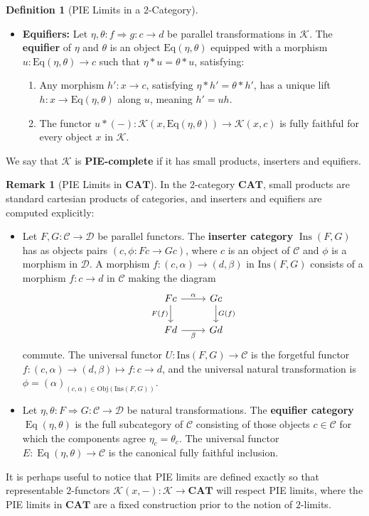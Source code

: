 \documentclass[11pt]{article}
\theoremstyle{plain}
\theoremstyle{definition}
\newtheorem{definition}[theorem]{Definition}
\newtheorem{remark}[theorem]{Remark}
\numberwithin{equation}{section}
\newcommand{\C}{\mathcal{C}}
\newcommand{\K}{\mathcal{K}}
\newcommand{\CAT}{\mathbf{CAT}}
\newcommand{\Ins}{\mathrm{Ins}}
\newcommand{\Eq}{\mathrm{Eq}}
\begin{document}
\begin{definition}[PIE Limits in a $2$-Category]
\begin{itemize}
       \item \textbf{Equifiers:} Let $\eta, \theta \colon f\Rightarrow g\colon c\to d$ be parallel transformations in $\K$. The \textbf{equifier} of $\eta$ and $\theta$ is an object $\Eq(\eta, \theta)$ equipped with a morphism $u \colon \Eq(\eta, \theta) \to c$ such that $\eta * u = \theta * u$, satisfying:
       \begin{enumerate}[label=(\roman*)]
           \item Any morphism $h'\colon x\to c$, satisfying $\eta*h' = \theta*h'$, has a unique lift $h\colon x\to \Eq(\eta,\theta)$ along $u$, meaning $h' = uh$.
           \item The functor $u*(-)\colon \K(x,\Eq(\eta,\theta))\to \K(x,c)$ is fully faithful for every object $x$ in $\K$.
       \end{enumerate}
   \end{itemize}
   We say that $\K$ is \textbf{PIE-complete} if it has small products, inserters and equifiers.
\end{definition}

\begin{remark}[PIE Limits in $\CAT$]
   In the $2$-category $\CAT$, small products are standard cartesian products of categories, and inserters and equifiers are computed explicitly:
   \begin{itemize}
       \item Let $F, G \colon \C \to \mathcal{D}$ be parallel functors. The \textbf{inserter category} $\operatorname{Ins}(F, G)$ has as objects pairs $(c, \phi\colon Fc\to Gc)$, where $c$ is an object of $\C$ and $\phi$ is a morphism in $\mathcal{D}$. A morphism $f\colon (c,\alpha)\to (d,\beta)$ in $\Ins(F,G)$ consists of a morphism $f\colon c\to d$ in $\C$ making the diagram
       $$
       \begin{tikzcd}
Fc \arrow[d, "F(f)"'] \arrow[r, "\alpha"] & Gc \arrow[d, "G(f)"] \\
Fd \arrow[r, "\beta"']                             & Gd                  
       \end{tikzcd}
       $$
       commute. The universal functor $U \colon \Ins(F, G) \to \C$ is the forgetful functor $f\colon (c,\alpha)\to (d,\beta)\mapsto f\colon c\to d$, and the universal natural transformation is $\phi= (\alpha)_{(c,\alpha)\in\mathrm{Obj}(\Ins(F,G))}$.

       \item Let $\eta,\theta\colon F\Rightarrow G\colon \C\to \mathcal{D}$ be natural transformations. The \textbf{equifier category} $\operatorname{Eq}(\eta, \theta)$ is the full subcategory of $\C$ consisting of those objects $c \in \C$ for which the components agree $\eta_c = \theta_c$. The universal functor $E \colon \operatorname{Eq}(\eta, \theta) \to \C$ is the canonical fully faithful inclusion.
   \end{itemize}
\end{remark}
It is perhaps useful to notice that PIE limits are defined exactly so that representable $2$-functors $\K(x,-)\colon \K\to \CAT$ will respect PIE limits, where the PIE limits in $\CAT$ are a fixed construction prior to the notion of $2$-limits.
\end{document}
